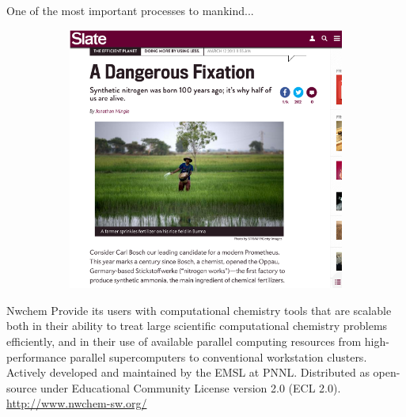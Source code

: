 \documentclass[aspectratio=169]{beamer}
\begin{document}
\begin{frame}{One of the most important processes to mankind...}
\begin{figure}
\begin{subfigure}{0.4\textwidth}
    \includegraphics[width=\linewidth]{lectures/figures/Lab1_Dangerous_Fixation.png}
    \end{subfigure}
\end{figure}
\end{frame}

\begin{frame}{Nwchem}
Provide its users with computational chemistry tools that are scalable both in their ability to treat large scientific computational chemistry problems efficiently, and in their use of available parallel computing resources from high-performance parallel supercomputers to conventional workstation clusters. \newline
\newline
Actively developed and maintained by the EMSL at PNNL.\newline
\newline
Distributed as open-source under Educational Community License version 2.0 (ECL 2.0).\newline
\newline
\url{http://www.nwchem-sw.org/}

\end{frame} 
\end{document}
